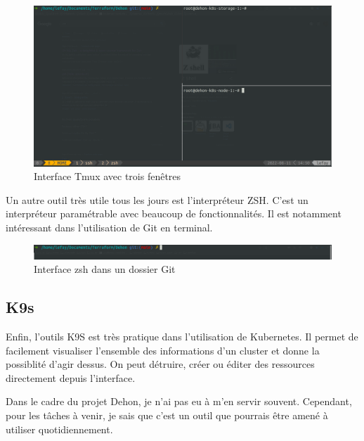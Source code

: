 \documentclass[12pt, a4paper, twoside]{article}
\begin{document}
\begin{figure}[!ht]
    \centering
        \includegraphics[width=\textwidth]{src/interface_tmux.png}
    \caption{Interface Tmux avec trois fenêtres}
    \label{fig:tmux}
\end{figure}

Un autre outil très utile tous les jours est l'interpréteur ZSH.
C'est un interpréteur paramétrable avec beaucoup de fonctionnalités.
Il est notamment intéressant dans l'utilisation de Git en terminal.

\begin{figure}[!ht]
    \centering
        \includegraphics[width=\textwidth]{src/interface_shell.png}
    \caption{Interface zsh dans un dossier Git}
    \label{fig:zsh}
\end{figure}

\newpage
\subsection{K9s}
Enfin, l'outils K9S est très pratique dans l'utilisation de \gls{Kubernetes}.
Il permet de facilement visualiser l'ensemble des informations d'un \gls{cluster} et donne la possiblité d'agir dessus.
On peut détruire, créer ou éditer des ressources directement depuis l'interface.

Dans le cadre du projet Dehon, je n'ai pas eu à m'en servir souvent.
Cependant, pour les tâches à venir, je sais que c'est un outil que pourrais être amené à utiliser quotidiennement.
\end{document}
